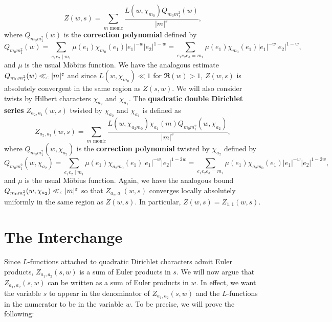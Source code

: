 \documentclass[12pt,reqno,oneside]{amsart}
\begin{document}
    \[
        Z(w,s) = \sum_{\text{$m$ monic}}\frac{L(w,\chi_{m_{0}})Q_{m_{0}m_{1}^{2}}(w)}{|m|^{s}},
    \]
    where $Q_{m_{0}m_{1}^{2}}(w)$ is the \textbf{correction polynomial} defined by
    \[
        Q_{m_{0}m_{1}^{2}}(w) = \sum_{e_{1}e_{2} \mid m_{1}}\mu(e_{1})\chi_{m_{0}}(e_{1})|e_{1}|^{-w}|e_{2}|^{1-w} = \sum_{e_{1}e_{2}e_{3} = m_{1}}\mu(e_{1})\chi_{m_{0}}(e_{1})|e_{1}|^{-w}|e_{2}|^{1-w},
    \]
    and $\mu$ is the usual M\"obius function. We have the analogous estimate $Q_{m_{0}m_{1}^{2}}(w) \ll_{\varepsilon} |m|^{\varepsilon}$ and since $L(w,\chi_{m_{0}}) \ll 1$ for $\Re(w) > 1$, $Z(w,s)$ is absolutely convergent in the same region as $Z(s,w)$. We will also consider twists by Hilbert characters $\chi_{a_{2}}$ and $\chi_{a_{1}}$. The \textbf{quadratic double Dirichlet series} $Z_{a_{2},a_{1}}(w,s)$ twisted by $\chi_{a_{2}}$ and $\chi_{a_{1}}$ is defined as
    \[
        Z_{a_{2},a_{1}}(w,s) = \sum_{\text{$m$ monic}}\frac{L(w,\chi_{a_{2}m_{0}})\chi_{a_{1}}(m)Q_{m_{0}m_{1}^{2}}(w,\chi_{a_{2}})}{|m|^{s}},
    \]
    where $Q_{m_{0}m_{1}^{2}}(w,\chi_{a_{2}})$ is the \textbf{correction polynomial} twisted by $\chi_{a_{2}}$ defined by
    \[
        Q_{m_{0}m_{1}^{2}}(w,\chi_{a_{2}}) = \sum_{e_{1}e_{2} \mid m_{1}}\mu(e_{1})\chi_{a_{2}m_{0}}(e_{1})|e_{1}|^{-w}|e_{2}|^{1-2w} = \sum_{e_{1}e_{2}e_{3} = m_{1}}\mu(e_{1})\chi_{a_{2}m_{0}}(e_{1})|e_{1}|^{-w}|e_{2}|^{1-2w},
    \]
    and $\mu$ is the usual M\"obius function. Again, we have the analogous bound $Q_{m_{0}m_{1}^{2}}(w,\chi_{a_{2}}) \ll_{\varepsilon} |m|^{\varepsilon}$ so that $Z_{a_{2},a_{1}}(w,s)$ converges locally absolutely uniformly in the same region as $Z(w,s)$. In particular, $Z(w,s) = Z_{1,1}(w,s)$.
\section{The Interchange}
    Since $L$-functions attached to quadratic Dirichlet characters admit Euler products, $Z_{a_{1},a_{2}}(s,w)$ is a sum of Euler products in $s$. We will now argue that $Z_{a_{1},a_{2}}(s,w)$ can be written as a sum of Euler products in $w$. In effect, we want the variable $s$ to appear in the denominator of $Z_{a_{1},a_{2}}(s,w)$ and the $L$-functions in the numerator to be in the variable $w$. To be precise, we will prove the following:
\end{document}
